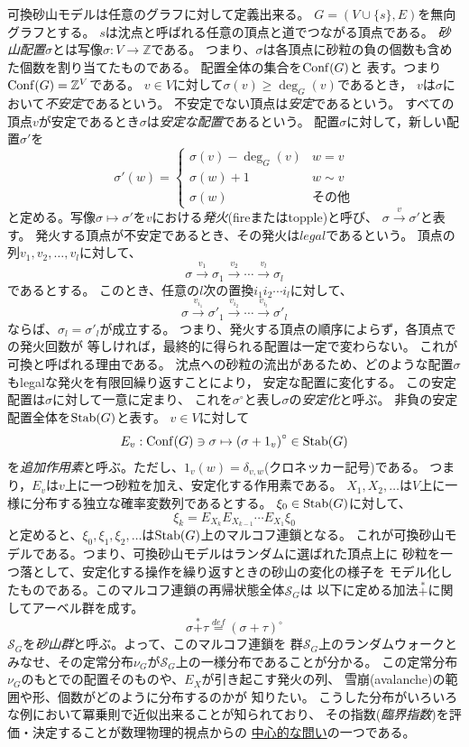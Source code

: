 \documentclass[lualatex,12pt,ja=standard]{bxjsreport}
\begin{document}
可換砂山モデルは任意のグラフに対して定義出来る。
$G=(V\cup\{s\},E)$を無向グラフとする。
$s$は沈点と呼ばれる任意の頂点と道でつながる頂点である。
{\em 砂山配置}$\sigma$とは写像$\sigma: V\to {\mathbb Z}$である。
つまり、$\sigma$は各頂点に砂粒の負の個数も含めた個数を割り当てたものである。
配置全体の集合を${\rm Conf}(G)$と
表す。つまり${\rm Conf}(G)={\mathbb Z}^V$である。
$v\in V$に対して$\sigma(v)\geq \deg_G(v)$であるとき，
$v$は$\sigma$において{\em 不安定}であるという。
不安定でない頂点は{\em 安定}であるという。
すべての頂点$v$が安定であるとき$\sigma$は{\em 安定な配置}であるという。
配置$\sigma$に対して，新しい配置$\sigma'$を
\[
 \sigma'(w) = \begin{cases}
	      \sigma(v)-\deg_G(v) & w = v\\
	      \sigma(w)+1 & w\sim v\\
	      \sigma(w)& {その他}
	     \end{cases}
\]
と定める。写像$\sigma\mapsto \sigma'$を$v$における{\em 発火}(fireまたはtopple)と呼び、
$\sigma\stackrel{v}{\to}\sigma'$と表す。
発火する頂点が不安定であるとき、その発火は$legal$であるという。
頂点の列$v_1, v_2, \ldots, v_l$に対して、
\[
 \sigma \stackrel{v_1}{\to} \sigma_1 \stackrel{v_2}{\to}   \cdots
  \stackrel{v_l}{\to} \sigma_l
\]
であるとする。
このとき、任意の$l$次の置換$i_1i_2\cdots i_l$に対して、
\[
 \sigma \stackrel{v_{i_1}}{\to} \sigma'_1 \stackrel{v_{i_2}}{\to}   \cdots
  \stackrel{v_{i_l}}{\to} \sigma'_l
\]
ならば、$\sigma_l = \sigma'_l$が成立する。
つまり、発火する頂点の順序によらず，各頂点での発火回数が
等しければ，最終的に得られる配置は一定で変わらない。
これが可換と呼ばれる理由である。
沈点への砂粒の流出があるため、どのような配置$\sigma$もlegalな発火を有限回繰り返すことにより，
安定な配置に変化する。
この安定配置は$\sigma$に対して一意に定まり、
これを$\sigma^\circ$と表し$\sigma$の{\em 安定化}と呼ぶ。
非負の安定配置全体を${\rm Stab}(G)$と表す。
$v\in V$に対して
\[
E_v:{\rm Conf}(G)\ni \sigma\mapsto \left(\sigma + 1_v\right)^\circ\in {\rm Stab}(G)
\]
を{\em 追加作用素}と呼ぶ。ただし、$1_v(w) = \delta_{v,w}$(クロネッカー記号)である。
つまり，$E_v$は$v$上に一つ砂粒を加え、安定化する作用素である。
$X_1, X_2, \ldots$は$V$上に一様に分布する独立な確率変数列であるとする。
$\xi_0\in {\rm Stab}(G)$に対して、
\[
 \xi_k = E_{X_k}E_{X_{k-1}}\cdots E_{X_1} \xi_0
\]
と定めると、$\xi_0,\xi_1,\xi_2,\ldots$は${\rm Stab}(G)$上のマルコフ連鎖となる。
これが可換砂山モデルである。つまり、可換砂山モデルはランダムに選ばれた頂点上に
砂粒を一つ落として、安定化する操作を繰り返すときの砂山の変化の様子を
モデル化したものである。このマルコフ連鎖の再帰状態全体${\mathcal S}_G$は
以下に定める加法$\stackrel{*}{+}$に関してアーベル群を成す。
\[
 \sigma \stackrel{*}{+} \tau \stackrel{def}{=}
 \left(\sigma + \tau\right)^\circ
\]
${\mathcal S}_G$を{\em 砂山群}と呼ぶ。よって、このマルコフ連鎖を
群${\mathcal S}_G$上のランダムウォークと
みなせ、その定常分布$\nu_G$が${\mathcal S}_G$上の一様分布であることが分かる。
この定常分布$\nu_G$のもとでの配置そのものや、$E_X$が引き起こす発火の列、
雪崩(avalanche)の範囲や形、個数がどのように分布するのかが
知りたい。
こうした分布がいろいろな例において冪乗則で近似出来ることが知られており、
その指数({\em 臨界指数})を評価・決定することが数理物理的視点からの
\underline{中心的な問い}の一つである。
\end{document}
